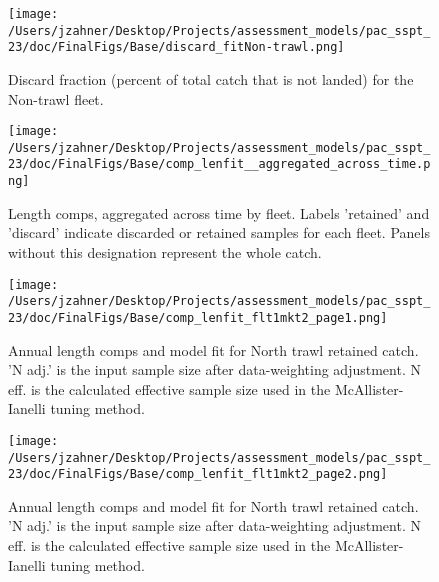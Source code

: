\documentclass[11pt,
  letterpaper,
]{article}
\begin{document}
\begin{figure}
{\centering
\texttt{[image: /Users/jzahner/Desktop/Projects/assessment\_models/pac\_sspt\_23/doc/FinalFigs/Base/discard\_fitNon-trawl.png]}
}
\caption{Discard fraction (percent of total catch that is not landed) for the Non-trawl fleet.\label{fig:nontrl_disc}}
\end{figure}

\begin{figure}
{\centering
\texttt{[image: /Users/jzahner/Desktop/Projects/assessment\_models/pac\_sspt\_23/doc/FinalFigs/Base/comp\_lenfit\_\_aggregated\_across\_time.png]}
}
\caption{Length comps, aggregated across time by fleet. Labels 'retained' and 'discard' indicate discarded or retained samples for each fleet. Panels without this designation represent the whole catch.\label{fig:lencomps_all}}
\end{figure}

\begin{figure}
{\centering
\texttt{[image: /Users/jzahner/Desktop/Projects/assessment\_models/pac\_sspt\_23/doc/FinalFigs/Base/comp\_lenfit\_flt1mkt2\_page1.png]}
}
\caption{Annual length comps and model fit for North trawl retained catch. 'N adj.' is the input sample size after data-weighting adjustment. N eff. is the calculated effective sample size used in the McAllister-Ianelli tuning method.\label{fig:ntrawl_comps_1}}
\end{figure}

\begin{figure}
{\centering
\texttt{[image: /Users/jzahner/Desktop/Projects/assessment\_models/pac\_sspt\_23/doc/FinalFigs/Base/comp\_lenfit\_flt1mkt2\_page2.png]}
}
\caption{Annual length comps and model fit for North trawl retained catch. 'N adj.' is the input sample size after data-weighting adjustment. N eff. is the calculated effective sample size used in the McAllister-Ianelli tuning method.\label{fig:ntrawl_comps_2}}
\end{figure}
\end{document}
